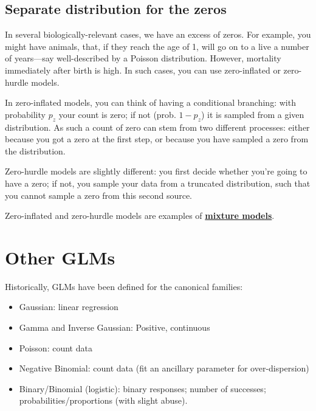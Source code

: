\documentclass[
  letterpaper,
  DIV=11,
  numbers=noendperiod]{scrreprt}
\providecommand{\tightlist}{%
  \setlength{\itemsep}{0pt}\setlength{\parskip}{0pt}}\usepackage{longtable,booktabs,array}
\begin{document}
\hypertarget{separate-distribution-for-the-zeros}{%
\subsection{Separate distribution for the
zeros}\label{separate-distribution-for-the-zeros}}

In several biologically-relevant cases, we have an excess of zeros. For
example, you might have animals, that, if they reach the age of 1, will
go on to a live a number of years---say well-described by a Poisson
distribution. However, mortality immediately after birth is high. In
such cases, you can use zero-inflated or zero-hurdle models.

In zero-inflated models, you can think of having a conditional
branching: with probability \(p_z\) your count is zero; if not (prob.
\(1-p_z\)) it is sampled from a given distribution. As such a count of
zero can stem from two different processes: either because you got a
zero at the first step, or because you have sampled a zero from the
distribution.

Zero-hurdle models are slightly different: you first decide whether
you're going to have a zero; if not, you sample your data from a
truncated distribution, such that you cannot sample a zero from this
second source.

Zero-inflated and zero-hurdle models are examples of
\href{https://en.wikipedia.org/wiki/Mixture_model}{\textbf{mixture
models}}.

\hypertarget{other-glms}{%
\section{Other GLMs}\label{other-glms}}

Historically, GLMs have been defined for the canonical families:

\begin{itemize}
\tightlist
\item
  Gaussian: linear regression
\item
  Gamma and Inverse Gaussian: Positive, continuous
\item
  Poisson: count data
\item
  Negative Binomial: count data (fit an ancillary parameter for
  over-dispersion)
\item
  Binary/Binomial (logistic): binary responses; number of successes;
  probabilities/proportions (with slight abuse).
\end{itemize}
\end{document}

